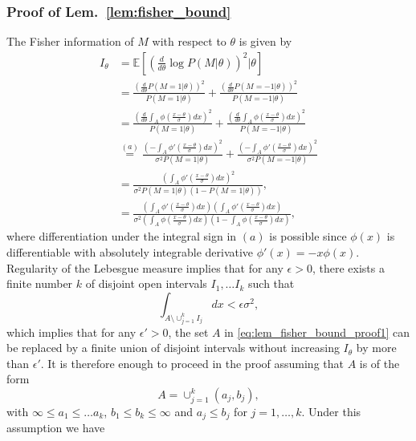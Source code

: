 \documentclass[letterpaper, conference,9pt]{IEEEtran}      %
\begin{document}
\subsubsection*{Proof of Lem.~\ref{lem:fisher_bound}}
The Fisher information of $M$ with respect to $\theta$ is given by
\begin{align}
I_\theta & =  \mathbb E \left[ \left( \frac{d}{d\theta} \log P\left( M | \theta \right) \right)^2 |\theta \right] \nonumber \\
& = \frac{ \left(\frac{d}{d\theta} P(M=1|\theta) \right)^2}{P(M=1| \theta)} + \frac{ \left(\frac{d}{d\theta} P(M=-1|\theta) \right)^2} {P(M=-1| \theta)} \nonumber \\
& =  \frac{ \left( \frac{d}{d\theta} \int_A \phi \left( \frac{x-\theta}{\sigma} \right)dx \right)^2} { P(M=1| \theta) } + \frac{ \left( \frac{d}{d\theta}\int_A \phi \left( \frac{x-\theta}{\sigma} \right)dx \right)^2} { P(M=-1| \theta) } \nonumber \\ 
& \overset{(a)}{=} \frac{ \left( - \int_A \phi' \left( \frac{x-\theta}{\sigma} \right)dx \right)^2} {\sigma^2 P(M=1| \theta) } + \frac{ \left(- \int_A \phi' \left( \frac{x-\theta}{\sigma} \right)dx \right)^2} { \sigma^2P(M=-1| \theta) } \nonumber \\ 
& = \frac{\left( \int_A \phi'\left( \frac{x-\theta}{\sigma} \right) dx \right)^2 }{  \sigma^2 P(M=1 | \theta) \left(1-P(M=1|\theta) \right)  }, \nonumber \\
& = \frac{\left( \int_A \phi'\left( \frac{x-\theta}{\sigma} \right) dx \right) \left( \int_A \phi'\left( \frac{x-\theta}{\sigma} \right) dx \right)}{  \sigma^2 \left( \int_A \phi \left( \frac{x-\theta}{\sigma} \right) dx \right)  \left(1- \int_A \phi \left( \frac{x-\theta}{\sigma} \right) dx \right) }, \label{eq:lem_fisher_bound_proof1}
\end{align}
where differentiation under the integral sign in $(a)$ is possible since $\phi(x)$ is differentiable with absolutely integrable derivative $\phi'(x) = -x\phi(x)$. Regularity of the Lebesgue measure implies that for any $\epsilon>0$, there exists a finite number $k$ of disjoint open intervals $I_1,\ldots I_k$ such that 
\[
\int_{A\setminus \cup_{j=1}^k I_j }  dx < \epsilon \sigma^2,
\]
which implies that for any $\epsilon' > 0$, the set $A$ in \eqref{eq:lem_fisher_bound_proof1} can be replaced by a finite union of disjoint intervals without increasing $I_\theta$ by more than $\epsilon'$. It is therefore enough to proceed in the proof assuming that $A$ is of the form
\[
A = \cup_{j=1}^k (a_j,b_j),
\]
with $\infty \leq a_1 \leq \ldots a_k$, $b_1 \leq b_k \leq \infty$ and $a_j \leq b_j$ for $j=1,\ldots,k$. Under this assumption we have
\end{document}
